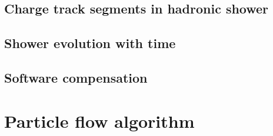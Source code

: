 \subsection{Charge track segments in hadronic shower}
\subsection{Shower evolution with time}
\subsection{Software compensation}

\section{Particle flow algorithm}















